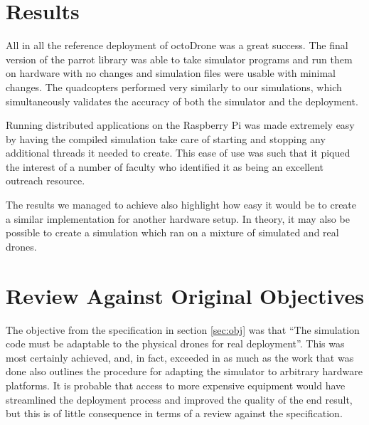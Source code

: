 \section{Results}
All in all the reference deployment of octoDrone was a great success. The final version of the parrot library was able to take simulator programs and run them on hardware with no changes and simulation files were usable with minimal changes. The quadcopters performed very similarly to our simulations, which simultaneously validates the accuracy of both the simulator and the deployment.

Running distributed applications on the Raspberry Pi was made extremely easy by having the compiled simulation take care of starting and stopping any additional threads it needed to create. This ease of use was such that it piqued the interest of a number of faculty who identified it as being an excellent outreach resource.

The results we managed to achieve also highlight how easy it would be to create a similar implementation for another hardware setup. In theory, it may also be possible to create a simulation which ran on a mixture of simulated and real drones. 

\section{Review Against Original Objectives}
The objective from the specification in section \ref{sec:obj} was that ``The simulation code must be adaptable to the physical drones for real deployment''. This was most certainly achieved, and, in fact, exceeded in as much as the work that was done also outlines the procedure for adapting the simulator to arbitrary hardware platforms. It is probable that access to more expensive equipment would have streamlined the deployment process and improved the quality of the end result, but this is of little consequence in terms of a review against the specification.